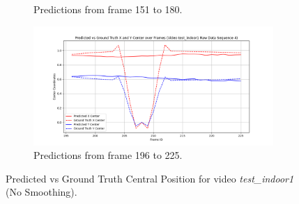 \documentclass[12pt,oneside]{book} %
\begin{document}
\begin{figure}[H]
\begin{subfigure}[t]{0.45\textwidth}
        \caption{Predictions from frame 151 to 180.}
        \label{fig:framework-test_indoor1-3}
    \end{subfigure}
    \hfill
    \begin{subfigure}[t]{0.45\textwidth}
        \includegraphics[width=\textwidth]{figures/framework/test_indoor1 Raw Data - 4.png}
        \caption{Predictions from frame 196 to 225.}
        \label{fig:framework-test_indoor1-4}
    \end{subfigure}
    \caption{Predicted vs Ground Truth Central Position for video \textit{test\_indoor1} (No Smoothing). }
    \label{fig:framework-test_indoor1}
\end{figure}
\end{document}
